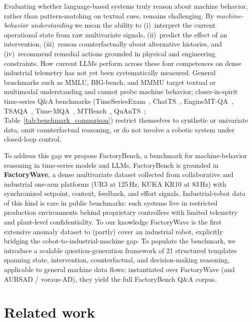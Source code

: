 \documentclass{article}
\begin{document}
Evaluating whether language-based systems truly reason about machine behavior, rather than pattern-matching on textual cues, remains challenging. By \emph{machine-behavior understanding} we mean the ability to (i)~interpret the current operational state from raw multivariate signals, (ii)~predict the effect of an intervention, (iii)~reason counterfactually about alternative histories, and (iv)~recommend remedial actions grounded in physical and engineering constraints. How current LLMs perform across these four competences on dense industrial telemetry has not yet been systematically measured. General benchmarks such as MMLU, BIG-bench, and MMMU \cite{hendrycks2021mmlu,srivastava2023bigbench,yue2024mmmu} target textual or multimodal understanding and cannot probe machine behavior; closer-in-spirit time-series Q\&A benchmarks (TimeSeriesExam~\cite{cai2024timeseriesexamtimeseriesunderstanding}, ChatTS~\cite{Xie_2025}, EngineMT-QA~\cite{wang2025itformerbridgingtimeseries}, TSAQA~\cite{jing2026tsaqatimeseriesanalysis}, Time-MQA~\cite{kong2025timemqatimeseriesmultitask}, MTBench~\cite{chen2026mtbenchmultimodaltimeseries}, QuAnTS~\cite{wenkel2024quants}; Table~\ref{tab:benchmark_comparison}) restrict themselves to synthetic or univariate data, omit counterfactual reasoning, or do not involve a robotic system under closed-loop control.

To address this gap we propose FactoryBench, a benchmark for machine-behavior reasoning in time-series models and LLMs. FactoryBench is grounded in \textbf{FactoryWave}, a dense multivariate dataset collected from collaborative and industrial one-arm platforms (UR3 at 125\,Hz, KUKA KR10 at 83\,Hz) with synchronized setpoint, context, feedback, and effort signals. Industrial-robot data of this kind is rare in public benchmarks: such systems live in restricted production environments behind proprietary controllers with limited telemetry and plant-level confidentiality. To our knowledge FactoryWave is the first extensive anomaly dataset to (partly) cover an industrial robot, explicitly bridging the cobot-to-industrial-machine gap. To populate the benchmark, we introduce a scalable question-generation framework of 21 structured templates spanning state, intervention, counterfactual, and decision-making reasoning, applicable to general machine data flows; instantiated over FactoryWave (and AURSAD / voraus-AD), they yield the full FactoryBench Q\&A corpus.

\section{Related work}
\end{document}

